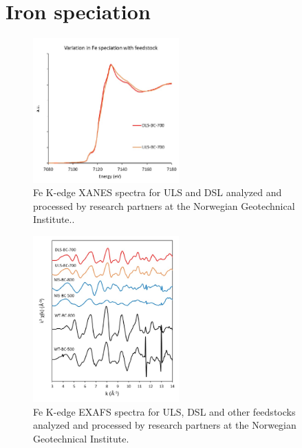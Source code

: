 \chapter{Iron speciation}\label{appSec:Fe}

\begin{figure}
    \centering
    \includegraphics[width=0.5\textwidth]{Diagrams/Valence.pdf}
    \caption{Fe K-edge XANES spectra for ULS and DSL analyzed and processed by research partners at the Norwegian Geotechnical Institute..}
    \label{appFig:valence}
\end{figure}

\begin{figure}
    \centering
    \includegraphics[width=0.5\textwidth]{Diagrams/Fe_species.pdf}
    \caption{Fe K-edge EXAFS spectra for ULS, DSL and other feedstocks analyzed and processed by research partners at the Norwegian Geotechnical Institute.}
    \label{appFig:Fe_species}
\end{figure}